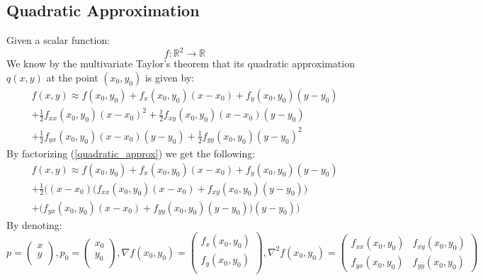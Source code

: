 \subsection{Quadratic Approximation}
Given a scalar function:
$$f:\mathbb{R}^2\rightarrow\mathbb{R}$$
We know by the multivariate Taylor's theorem that its quadratic approximation $q\left(x,y\right)$ at the point $\left(x_0,y_0\right)$ is given by:
\begin{equation}\label{quadratic_approx}
\begin{split}
f\left(x,y\right) \approx f\left(x_0,y_0\right) + f_x\left(x_0,y_0\right)\left(x - x_0\right) + f_y\left(x_0,y_0\right)\left(y - y_0\right) \\ + \frac{1}{2}f_{xx}\left(x_0,y_0\right)\left(x - x_0\right)^2 + \frac{1}{2}f_{xy}\left(x_0,y_0\right)\left(x - x_0\right)\left(y - y_0\right) \\ +  \frac{1}{2}f_{yx}\left(x_0,y_0\right)\left(x - x_0\right)\left(y - y_0\right) + \frac{1}{2}f_{yy}\left(x_0,y_0\right)\left(y - y_0\right)^2
\end{split}
\end{equation}
By factorizing (\ref{quadratic_approx}) we get the following:
\begin{equation}\label{factorized_quadratic_approx}
\begin{split}
f\left(x,y\right) \approx f\left(x_0,y_0\right) + f_x\left(x_0,y_0\right)\left(x - x_0\right) + f_y\left(x_0,y_0\right)\left(y - y_0\right) \\ + \frac{1}{2}\Big(\left(x - x_0\right)\big( f_{xx}\left(x_0,y_0\right) \left(x - x_0\right) + f_{xy}\left(x_0,y_0\right) \left(y - y_0\right) \big) \\ + \big( f_{yx}\left(x_0,y_0\right) \left(x - x_0\right) + f_{yy}\left(x_0,y_0\right) \left(y - y_0\right) \big)\left(y - y_0\right)\Big)
\end{split}
\end{equation}
By denoting:
$$
p = 
\begin{pmatrix}
x\\
y\\
\end{pmatrix},
p_0 = 
\begin{pmatrix}
x_0\\
y_0\\
\end{pmatrix},
\nabla f\left(x_0,y_0\right) = 
\begin{pmatrix}
f_x\left(x_0,y_0\right)\\
f_y\left(x_0,y_0\right)\\
\end{pmatrix},
\nabla^2 f\left(x_0,y_0\right) = 
\begin{pmatrix}
f_{xx}\left(x_0,y_0\right) & f_{xy}\left(x_0,y_0\right)\\
f_{yx}\left(x_0,y_0\right) & f_{yy}\left(x_0,y_0\right)
\end{pmatrix}
$$
